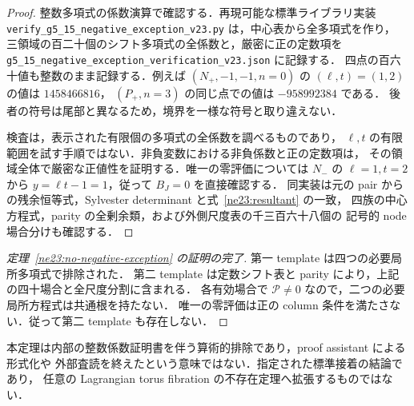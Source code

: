 \begin{proof}
整数多項式の係数演算で確認する．再現可能な標準ライブラリ実装
\nolinkurl{verify_g5_15_negative_exception_v23.py} は，中心表から全多項式を作り，
三領域の百二十個のシフト多項式の全係数と，厳密に正の定数項を
\nolinkurl{g5_15_negative_exception_verification_v23.json} に記録する．
四点の百六十値も整数のまま記録する．例えば
$(N_+,-1,-1,n=0)$ の $(\ell,t)=(1,2)$ の値は $1458466816$，
$(P_+,n=3)$ の同じ点での値は $-958992384$ である．
後者の符号は尾部と異なるため，境界を一様な符号と取り違えない．

検査は，表示された有限個の多項式の全係数を調べるものであり，
$\ell,t$ の有限範囲を試す手順ではない．非負変数における非負係数と正の定数項は，
その領域全体で厳密な正値性を証明する．唯一の零評価については
$N_-$ の $\ell=1,t=2$ から $y=\ell t-1=1$，従って $B_J=0$ を直接確認する．
同実装は元の pair からの残余恒等式，Sylvester determinant と式~\eqref{ne23:resultant} の一致，
四族の中心方程式，parity の全剰余類，および外側尺度表の千三百六十八個の
記号的 node 場合分けも確認する．
\end{proof}

\begin{proof}[定理~\ref{ne23:no-negative-exception} の証明の完了]
第一 template は四つの必要局所多項式で排除された．
第二 template は定数シフト表と parity により，上記の四十場合と全尺度分割に含まれる．
各有効場合で $\mathcal P\ne0$ なので，二つの必要局所方程式は共通根を持たない．
唯一の零評価は正の column 条件を満たさない．従って第二 template も存在しない．
\end{proof}

本定理は内部の整数係数証明書を伴う算術的排除であり，proof assistant による形式化や
外部査読を終えたという意味ではない．指定された標準接着の結論であり，
任意の Lagrangian torus fibration の不存在定理へ拡張するものではない．
